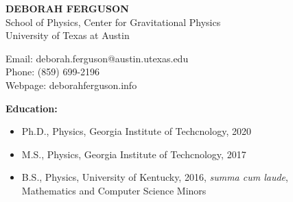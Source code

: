 \documentclass[11pt]{article}
\begin{document}
%	
\begin{center}
  \textbf{DEBORAH FERGUSON}\\
  School of Physics, Center for Gravitational Physics\\
  University of Texas at Austin\\
\end{center}  

\begin{flushleft}

  Email: deborah.ferguson@austin.utexas.edu\\
  Phone: (859) 699-2196\\
  Webpage: deborahferguson.info\\
  \vspace{8px}
  
  \textbf{Education:}
  \begin{itemize}
  \item Ph.D., Physics, Georgia Institute of Techcnology, 2020
  \item M.S., Physics, Georgia Institute of Techcnology, 2017
  \item B.S., Physics, University of Kentucky, 2016, \textit{summa cum laude}, \\ Mathematics and Computer Science Minors
  \end{itemize}


\end{flushleft}
\end{document}
